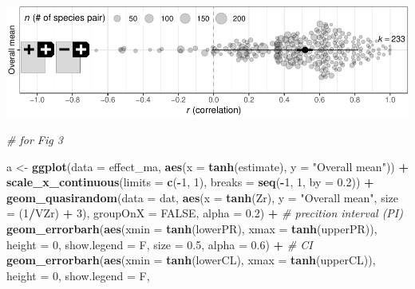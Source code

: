 \documentclass[
]{article}
\newenvironment{Shaded}{\begin{snugshade}}{\end{snugshade}}
\newcommand{\CommentTok}[1]{\textcolor[rgb]{0.56,0.35,0.01}{\textit{#1}}}
\newcommand{\DataTypeTok}[1]{\textcolor[rgb]{0.13,0.29,0.53}{#1}}
\newcommand{\DecValTok}[1]{\textcolor[rgb]{0.00,0.00,0.81}{#1}}
\newcommand{\FloatTok}[1]{\textcolor[rgb]{0.00,0.00,0.81}{#1}}
\newcommand{\KeywordTok}[1]{\textcolor[rgb]{0.13,0.29,0.53}{\textbf{#1}}}
\newcommand{\NormalTok}[1]{#1}
\newcommand{\OperatorTok}[1]{\textcolor[rgb]{0.81,0.36,0.00}{\textbf{#1}}}
\newcommand{\OtherTok}[1]{\textcolor[rgb]{0.56,0.35,0.01}{#1}}
\newcommand{\StringTok}[1]{\textcolor[rgb]{0.31,0.60,0.02}{#1}}
\begin{document}
\includegraphics{Supporting_Information_files/figure-latex/unnamed-chunk-12-1.pdf}

\begin{Shaded}
\begin{Highlighting}[]
\CommentTok{# for Fig 3}

\NormalTok{a <-}\StringTok{ }\KeywordTok{ggplot}\NormalTok{(}\DataTypeTok{data =}\NormalTok{ effect_ma, }\KeywordTok{aes}\NormalTok{(}\DataTypeTok{x =} \KeywordTok{tanh}\NormalTok{(estimate), }\DataTypeTok{y =} \StringTok{"Overall mean"}\NormalTok{)) }\OperatorTok{+}\StringTok{ }\KeywordTok{scale_x_continuous}\NormalTok{(}\DataTypeTok{limits =} \KeywordTok{c}\NormalTok{(}\OperatorTok{-}\DecValTok{1}\NormalTok{, }
    \DecValTok{1}\NormalTok{), }\DataTypeTok{breaks =} \KeywordTok{seq}\NormalTok{(}\OperatorTok{-}\DecValTok{1}\NormalTok{, }\DecValTok{1}\NormalTok{, }\DataTypeTok{by =} \FloatTok{0.2}\NormalTok{)) }\OperatorTok{+}\StringTok{ }\KeywordTok{geom_quasirandom}\NormalTok{(}\DataTypeTok{data =}\NormalTok{ dat, }\KeywordTok{aes}\NormalTok{(}\DataTypeTok{x =} \KeywordTok{tanh}\NormalTok{(Zr), }
    \DataTypeTok{y =} \StringTok{"Overall mean"}\NormalTok{, }\DataTypeTok{size =}\NormalTok{ (}\DecValTok{1}\OperatorTok{/}\NormalTok{VZr) }\OperatorTok{+}\StringTok{ }\DecValTok{3}\NormalTok{), }\DataTypeTok{groupOnX =} \OtherTok{FALSE}\NormalTok{, }\DataTypeTok{alpha =} \FloatTok{0.2}\NormalTok{) }\OperatorTok{+}\StringTok{ }\CommentTok{# precition interval (PI)}
\KeywordTok{geom_errorbarh}\NormalTok{(}\KeywordTok{aes}\NormalTok{(}\DataTypeTok{xmin =} \KeywordTok{tanh}\NormalTok{(lowerPR), }\DataTypeTok{xmax =} \KeywordTok{tanh}\NormalTok{(upperPR)), }\DataTypeTok{height =} \DecValTok{0}\NormalTok{, }\DataTypeTok{show.legend =}\NormalTok{ F, }
    \DataTypeTok{size =} \FloatTok{0.5}\NormalTok{, }\DataTypeTok{alpha =} \FloatTok{0.6}\NormalTok{) }\OperatorTok{+}\StringTok{ }\CommentTok{# CI}
\KeywordTok{geom_errorbarh}\NormalTok{(}\KeywordTok{aes}\NormalTok{(}\DataTypeTok{xmin =} \KeywordTok{tanh}\NormalTok{(lowerCL), }\DataTypeTok{xmax =} \KeywordTok{tanh}\NormalTok{(upperCL)), }\DataTypeTok{height =} \DecValTok{0}\NormalTok{, }\DataTypeTok{show.legend =}\NormalTok{ F, }

\end{Highlighting}
\end{Shaded}
\end{document}
